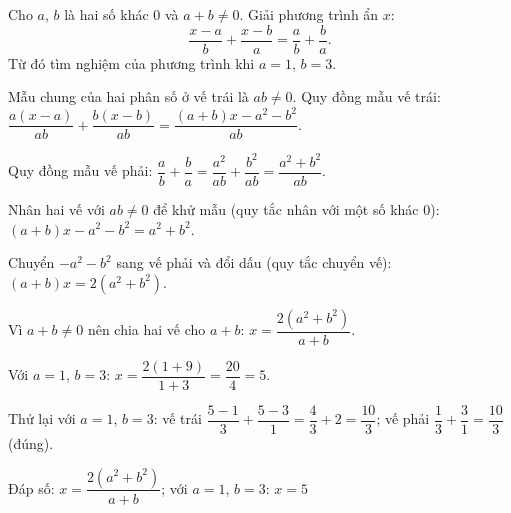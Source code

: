 \begin{problem}[8DS-PT1-050]
Cho $a$, $b$ là hai số khác $0$ và $a + b \neq 0$. Giải phương trình ẩn $x$:
\[ \dfrac{x - a}{b} + \dfrac{x - b}{a} = \dfrac{a}{b} + \dfrac{b}{a}. \]
Từ đó tìm nghiệm của phương trình khi $a = 1$, $b = 3$.

\begin{solution}
Mẫu chung của hai phân số ở vế trái là $ab \neq 0$. Quy đồng mẫu vế trái: $\dfrac{a(x - a)}{ab} + \dfrac{b(x - b)}{ab} = \dfrac{(a + b)x - a^2 - b^2}{ab}$.

Quy đồng mẫu vế phải: $\dfrac{a}{b} + \dfrac{b}{a} = \dfrac{a^2}{ab} + \dfrac{b^2}{ab} = \dfrac{a^2 + b^2}{ab}$.

Nhân hai vế với $ab \neq 0$ để khử mẫu (quy tắc nhân với một số khác $0$): $(a + b)x - a^2 - b^2 = a^2 + b^2$.

Chuyển $-a^2 - b^2$ sang vế phải và đổi dấu (quy tắc chuyển vế): $(a + b)x = 2(a^2 + b^2)$.

Vì $a + b \neq 0$ nên chia hai vế cho $a + b$: $x = \dfrac{2(a^2 + b^2)}{a + b}$.

Với $a = 1$, $b = 3$: $x = \dfrac{2(1 + 9)}{1 + 3} = \dfrac{20}{4} = 5$.

Thử lại với $a = 1$, $b = 3$: vế trái $\dfrac{5 - 1}{3} + \dfrac{5 - 3}{1} = \dfrac{4}{3} + 2 = \dfrac{10}{3}$; vế phải $\dfrac{1}{3} + \dfrac{3}{1} = \dfrac{10}{3}$ (đúng).

Đáp số: $\boxed{x = \dfrac{2(a^2 + b^2)}{a + b}}$; với $a = 1$, $b = 3$: $\boxed{x = 5}$
\end{solution}
\end{problem}

